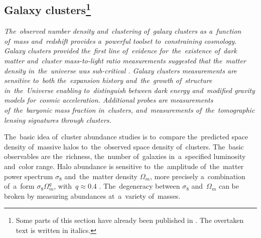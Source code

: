 \subsection[Galaxy clusters]{Galaxy clusters\footnote{Some parts of this section have already been published in \textcite{mastersthesis_vrastil}. The overtaken text is written in italics.}}
\label{ssec:gc}
{\itshape
The~observed number density and~clustering of~galaxy clusters as a~function of~mass and~redshift provides a~powerful toolset to~constraining cosmology.  Galaxy clusters provided the~first line of~evidence for~the~existence of~dark matter \textcite{zwicky} and~cluster mass-to-light ratio measurements suggested that the~matter density in~the~universe was sub-critical \textcite{Gott}. Galaxy clusters measurements are sensitive to~both the~expansion history and~the~growth of~structure in~the~Universe enabling to~distinguish between dark energy and~modified gravity models for~cosmic acceleration. Additional probes are measurements of~the~baryonic mass fraction in~clusters, and~measurements of~the~tomographic lensing signatures through clusters.

The~basic idea of~cluster abundance studies is to~compare the~predicted space density of~massive halos to~the~observed space density of~clusters. The~basic observables are the~richness, the~number of~galaxies in~a~specified luminosity and~color range. Halo abundance is sensitive to~the~amplitude of~the~matter power spectrum $\sigma_8$ and~the~matter density $\Omega_m$, more precisely a~combination of~a~form $\sigma_8\Omega_m^q$, with~$q\approx0.4$ \textcite{white}. The~degeneracy between $\sigma_8$ and~$\Omega_m$ can be broken by measuring abundances at~a~variety of~masses.
}
